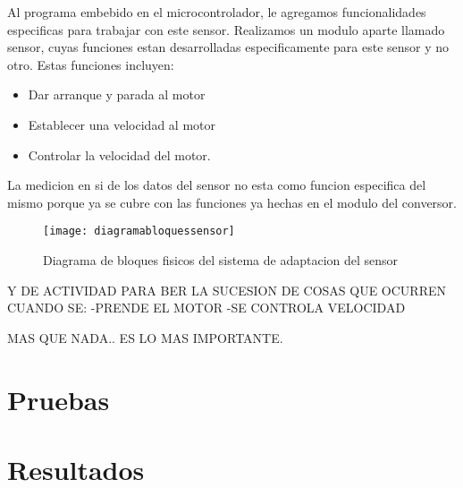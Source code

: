 Al programa embebido en el microcontrolador, le agregamos funcionalidades especificas para trabajar con este sensor. Realizamos un modulo aparte llamado sensor, cuyas funciones estan desarrolladas especificamente para este sensor y no otro. Estas funciones incluyen:

\begin{itemize}
	\item Dar arranque y parada al motor
	\item Establecer una velocidad al motor
	\item Controlar la velocidad del motor.
\end{itemize}

La medicion en si de los datos del sensor no esta como funcion especifica del mismo porque ya se cubre con las funciones ya hechas en el modulo del conversor.

\begin{figure}[h]
  \centering
  \texttt{[image: diagramabloquessensor]}
  \caption{Diagrama de bloques fisicos del sistema de adaptacion del sensor}\label{fig:diagramabloquessensor}
\end{figure}

Y DE ACTIVIDAD PARA BER LA SUCESION DE COSAS QUE OCURREN CUANDO SE:
-PRENDE EL MOTOR
-SE CONTROLA VELOCIDAD

MAS QUE NADA.. ES LO MAS IMPORTANTE.


\section{Pruebas} %
\label{sec:pruebas}


\section{Resultados} %
\label{sec:resultados}


